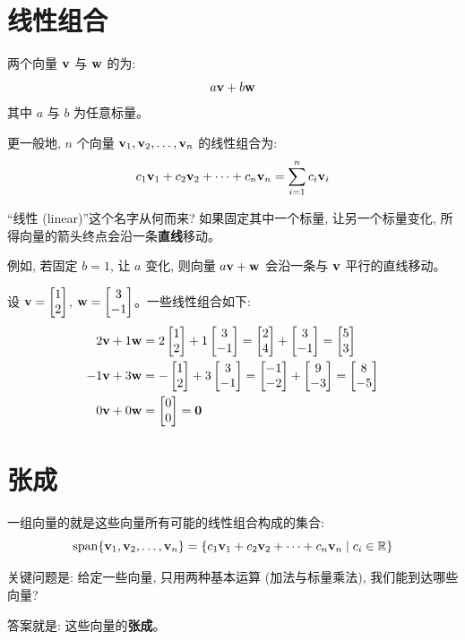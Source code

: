 \section{线性组合}

\begin{definition}
两个向量 $\mathbf{v}$ 与 $\mathbf{w}$ 的为:
\[
a\mathbf{v} + b\mathbf{w}
\]
其中 $a$ 与 $b$ 为任意标量。

更一般地, $n$ 个向量 $\mathbf{v}_1, \mathbf{v}_2, \ldots, \mathbf{v}_n$ 的线性组合为:
\[
c_1\mathbf{v}_1 + c_2\mathbf{v}_2 + \cdots + c_n\mathbf{v}_n = \sum_{i=1}^{n} c_i\mathbf{v}_i
\]
\end{definition}

\begin{intuition}
``线性 (linear)''这个名字从何而来? 如果固定其中一个标量, 让另一个标量变化, 所得向量的箭头终点会沿一条\textbf{直线}移动。

例如, 若固定 $b = 1$, 让 $a$ 变化, 则向量 $a\mathbf{v} + \mathbf{w}$ 会沿一条与 $\mathbf{v}$ 平行的直线移动。
\end{intuition}

\begin{example}
设 $\mathbf{v} = \begin{bmatrix} 1 \\ 2 \end{bmatrix}$, $\mathbf{w} = \begin{bmatrix} 3 \\ -1 \end{bmatrix}$。一些线性组合如下:
\begin{align*}
2\mathbf{v} + 1\mathbf{w} &= 2\begin{bmatrix} 1 \\ 2 \end{bmatrix} + 1\begin{bmatrix} 3 \\ -1 \end{bmatrix} = \begin{bmatrix} 2 \\ 4 \end{bmatrix} + \begin{bmatrix} 3 \\ -1 \end{bmatrix} = \begin{bmatrix} 5 \\ 3 \end{bmatrix} \\
-1\mathbf{v} + 3\mathbf{w} &= -\begin{bmatrix} 1 \\ 2 \end{bmatrix} + 3\begin{bmatrix} 3 \\ -1 \end{bmatrix} = \begin{bmatrix} -1 \\ -2 \end{bmatrix} + \begin{bmatrix} 9 \\ -3 \end{bmatrix} = \begin{bmatrix} 8 \\ -5 \end{bmatrix} \\
0\mathbf{v} + 0\mathbf{w} &= \begin{bmatrix} 0 \\ 0 \end{bmatrix} = \mathbf{0}
\end{align*}
\end{example}

\section{张成}

\begin{definition}[张成 (span)]
一组向量的就是这些向量所有可能的线性组合构成的集合:
\[
\operatorname{span}\{\mathbf{v}_1, \mathbf{v}_2, \ldots, \mathbf{v}_n\} = \{c_1\mathbf{v}_1 + c_2\mathbf{v}_2 + \cdots + c_n\mathbf{v}_n \mid c_i \in \mathbb{R}\}
\]
\end{definition}

\begin{intuition}
关键问题是: 给定一些向量, 只用两种基本运算 (加法与标量乘法), 我们能到达哪些向量?

答案就是: 这些向量的\textbf{张成}。
\end{intuition}


